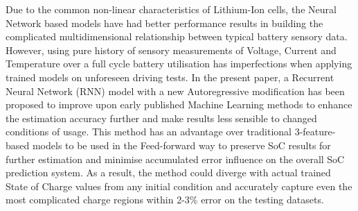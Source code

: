 {Due to the common non-linear characteristics of Lithium-Ion cells, the Neural Network based models have had better performance results in building the complicated multidimensional relationship between typical battery sensory data.
However, using pure history of sensory measurements of Voltage, Current and Temperature over a full cycle battery utilisation has imperfections when applying trained models on unforeseen driving tests.
In the present paper, a Recurrent Neural Network (RNN) model with a new Autoregressive modification has been proposed to improve upon early published Machine Learning methods to enhance the estimation accuracy further and make results less sensible to changed conditions of usage.
This method has an advantage over traditional 3-feature-based models to be used in the Feed-forward way to preserve SoC results for further estimation and minimise accumulated error influence on the overall SoC prediction system.
As a result, the method could diverge with actual trained State of Charge values from any initial condition and accurately capture even the most complicated charge regions within 2-3\% error on the testing datasets.
}